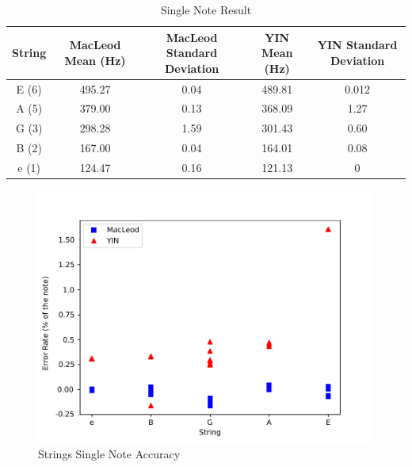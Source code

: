 \begin{table}[htb]
  \begin{center}
    \ABNTEXreducedfont
    \caption[Single Note Result]{Single Note Result}
    \label{single-note-result}
    \begin{tabular}{c | c | c | c | c}
      \hline
      String & MacLeod Mean (Hz) & MacLeod Standard Deviation & YIN Mean (Hz) & YIN Standard Deviation\\
      \hline \hline
      E (6) & 495.27 & 0.04 & 489.81 & 0.012 \\ \hline
      A (5) & 379.00 & 0.13 & 368.09 & 1.27 \\ \hline
      G (3) & 298.28 & 1.59 & 301.43 & 0.60 \\ \hline
      B (2) & 167.00 & 0.04 & 164.01 & 0.08 \\ \hline
      e (1) & 124.47 & 0.16 & 121.13 & 0 \\ \hline
    \end{tabular}
  \end{center}
\end{table}


\begin{figure}[!htpb]
  \centering
  \caption{Strings Single Note Accuracy}
  \label{single-note-accuracy}
  \includegraphics[scale=0.85]{images/measurements/single-note-acc-2}
\end{figure}

